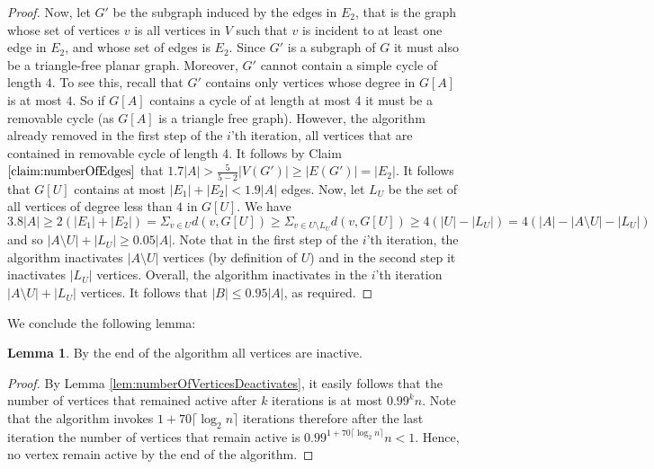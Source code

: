 \documentclass{article}
\theoremstyle{definition}
\newtheorem{lemma}{Lemma}[section]
\begin{document}
\begin{proof}
Now, let $G'$ be the subgraph induced by the edges in $E_{2}$, that is the graph whose set of vertices $v$ is all vertices in $V$ such that $v$ is incident to at least one edge in $E_2$,
and whose set of edges is $E_2$. Since $G'$ is a subgraph of $G$ it must also be a triangle-free planar graph. Moreover, $G'$ cannot contain a simple cycle of length $4$. To see this, recall that $G'$ contains only vertices whose degree in $G[A]$ is at most $4$. So if $G[A]$ contains a cycle of at length at most 4 it must be a removable cycle (as $G[A]$ is a triangle free graph). However, the algorithm already removed in the first step of the $i$'th iteration, all vertices that are contained in removable cycle of length 4. It follows by Claim $\ref{claim:numberOfEdges}$ that $1.7|A| > \frac{5}{5-2}|V(G')|\ge |E(G')| = |E_{2}|$. It follows that $G[U]$ contains at most $|E_{1}| + |E_{2}| < 1.9|A|$ edges. Now, let $L_U$ be the set of all vertices of degree less than $4$ in $G[U]$. We have $3.8|A| \ge 2(|E_{1}| + |E_{2}|) = \Sigma_{v \in U}d(v, G[U]) \ge \Sigma_{v \in U \setminus L_U}d(v, G[U]) \ge 4(|U| - |L_U|) = 4(|A| - |A \setminus U| - |L_U|)$ and so $|A \setminus U| + |L_U| \ge 0.05|A|$. Note that in the first step of the $i$'th iteration, the algorithm inactivates $|A \setminus U|$ vertices (by definition of $U$) and in the second step it inactivates $|L_U|$ vertices.
Overall, the algorithm inactivates in the $i$'th iteration $|A \setminus U| + |L_U|$ vertices.
It follows that $|B| \le 0.95|A|$, as required. %
\end{proof}

We conclude the following lemma:

\begin{lemma} By the end of the algorithm all vertices are inactive. \label{lem:numberOfVerticesDeactivatesCor}\end{lemma}

\begin{proof}
By Lemma \ref{lem:numberOfVerticesDeactivates}, it easily follows that the number of vertices that remained active after $k$ iterations  is at most $0.99^{k}n$.
Note that the algorithm invokes $ 1 + 70\lceil\log_{2}n\rceil$ iterations therefore after the last iteration the number of vertices that remain active is $0.99^{1 + 70\lceil\log_{2}n\rceil}n < 1$. Hence, no vertex remain active by the end of the algorithm.\end{proof}
\end{document}
